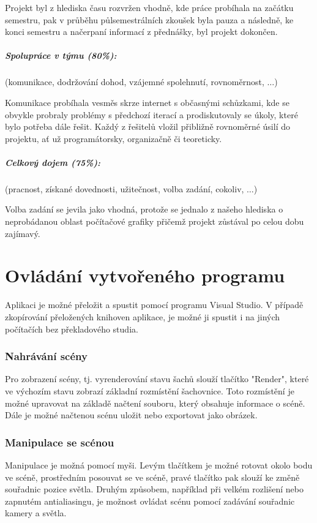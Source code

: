 \documentclass[12pt,a4paper,titlepage,final]{report}
\begin{document}
Projekt byl z hlediska času rozvržen vhodně, kde práce probíhala na začátku semestru, pak v průběhu půlsemestrálních zkoušek byla pauza a následně, ke konci semestru a načerpaní informací z přednášky, byl projekt dokončen.

\paragraph{Spolupráce v týmu (80\%):} (komunikace, dodržování dohod, vzájemné
spolehnutí, rovnoměrnost, $\ldots$)

Komunikace probíhala vesměs skrze internet s občasnými schůzkami, kde se obvykle probraly problémy s předchozí iterací a prodiskutovaly se úkoly, které bylo potřeba dále řešit. Každý z řešitelů vložil přibližně rovnoměrné úsilí do projektu, ať už programátorsky, organizačně či teoreticky.

\paragraph{Celkový dojem (75\%):} (pracnost, získané dovednosti, užitečnost,
volba zadání, cokoliv, $\ldots$)


Volba zadání se jevila jako vhodná, protože se jednalo z našeho hlediska o neprobádanou oblast počítačové grafiky přičemž projekt zůstával po celou dobu zajímavý.

\chapter{Ovládání vytvořeného programu}
Aplikaci je možné přeložit a spustit pomocí programu Visual Studio. V případě zkopírování přeložených knihoven aplikace, je možné ji spustit i na jiných počítačích bez překladového studia.

\subsection{Nahrávání scény}
Pro zobrazení scény, tj. vyrenderování stavu šachů slouží tlačítko "Render", které ve výchozím stavu zobrazí základní rozmístění šachovnice. Toto rozmístění je možné upravovat na základě načtení souboru, který obsahuje informace o scéně.
Dále je možné načtenou scénu uložit nebo exportovat jako obrázek.

\subsection{Manipulace se scénou}
Manipulace je možná pomocí myši. Levým tlačítkem je možné rotovat okolo bodu ve scéně, prostředním posouvat se ve scéně,
pravé tlačítko pak slouží ke změně souřadnic pozice světla. Druhým způsobem, například při velkém rozlišení nebo zapnutém antialiasingu, je možnost ovládat scénu pomocí zadávání souřadnic kamery a světla.
\end{document}
